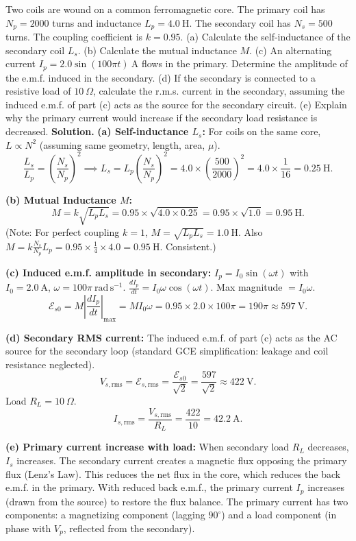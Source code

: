 \documentclass[11pt]{article}
\begin{document}
\begin{exoresolu}
Two coils are wound on a common ferromagnetic core. The primary coil has $N_p = 2000$ turns and inductance $L_p = 4.0\ \mathrm{H}$. The secondary coil has $N_s = 500$ turns. The coupling coefficient is $k = 0.95$. (a) Calculate the self-inductance of the secondary coil $L_s$. (b) Calculate the mutual inductance $M$. (c) An alternating current $I_p = 2.0 \sin(100\pi t)\ \mathrm{A}$ flows in the primary. Determine the amplitude of the e.m.f. induced in the secondary. (d) If the secondary is connected to a resistive load of $10\ \Omega$, calculate the r.m.s. current in the secondary, assuming the induced e.m.f. of part (c) acts as the source for the secondary circuit. (e) Explain why the primary current would increase if the secondary load resistance is decreased.
\tcblower
\textbf{Solution.}
\textbf{(a) Self-inductance $L_s$:} For coils on the same core, $L \propto N^2$ (assuming same geometry, length, area, $\mu$).
\[
\frac{L_s}{L_p} = \left(\frac{N_s}{N_p}\right)^2 \implies L_s = L_p \left(\frac{N_s}{N_p}\right)^2 = 4.0 \times \left(\frac{500}{2000}\right)^2 = 4.0 \times \frac{1}{16} = \boxed{0.25\ \mathrm{H}}.
\]

\textbf{(b) Mutual Inductance $M$:}
\[
M = k\sqrt{L_p L_s} = 0.95 \times \sqrt{4.0 \times 0.25} = 0.95 \times \sqrt{1.0} = \boxed{0.95\ \mathrm{H}}.
\]
(Note: For perfect coupling $k=1$, $M = \sqrt{L_p L_s} = 1.0\ \mathrm{H}$. Also $M = k \frac{N_s}{N_p} L_p = 0.95 \times \frac{1}{4} \times 4.0 = 0.95\ \mathrm{H}$. Consistent.)

\textbf{(c) Induced e.m.f. amplitude in secondary:}
$I_p = I_0 \sin(\omega t)$ with $I_0 = 2.0\ \mathrm{A}$, $\omega = 100\pi\ \mathrm{rad\,s^{-1}}$.
$\frac{dI_p}{dt} = I_0 \omega \cos(\omega t)$. Max magnitude $= I_0 \omega$.
\[
\mathcal{E}_{s0} = M \left|\frac{dI_p}{dt}\right|_{\text{max}} = M I_0 \omega = 0.95 \times 2.0 \times 100\pi = 190\pi \approx \boxed{597\ \mathrm{V}}.
\]

\textbf{(d) Secondary RMS current:}
The induced e.m.f. of part (c) acts as the AC source for the secondary loop (standard GCE simplification: leakage and coil resistance neglected).
\[
V_{s,\text{rms}} = \mathcal{E}_{s,\text{rms}} = \frac{\mathcal{E}_{s0}}{\sqrt{2}} = \frac{597}{\sqrt{2}} \approx 422\ \mathrm{V}.
\]
Load $R_L = 10\ \Omega$.
\[
I_{s,\text{rms}} = \frac{V_{s,\text{rms}}}{R_L} = \frac{422}{10} = \boxed{42.2\ \mathrm{A}}.
\]

\textbf{(e) Primary current increase with load:} When secondary load $R_L$ decreases, $I_s$ increases. The secondary current creates a magnetic flux opposing the primary flux (Lenz's Law). This reduces the net flux in the core, which reduces the back e.m.f. in the primary. With reduced back e.m.f., the primary current $I_p$ increases (drawn from the source) to restore the flux balance. The primary current has two components: a magnetizing component (lagging $90^\circ$) and a load component (in phase with $V_p$, reflected from the secondary).
\end{exoresolu}
\end{document}
